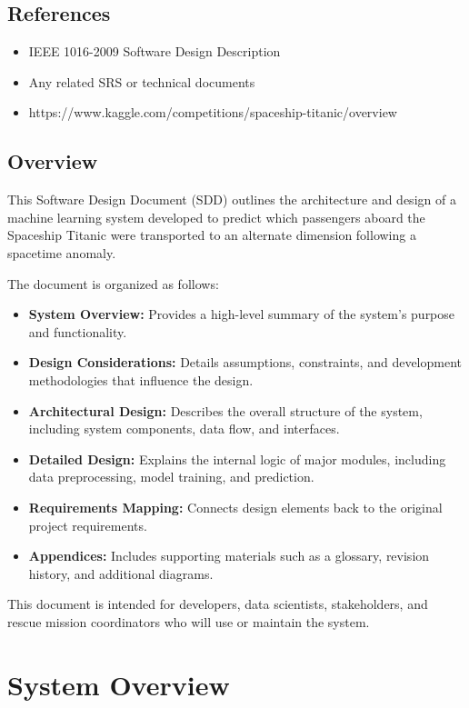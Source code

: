 \documentclass[15pt]{article}
\begin{document}
\subsection{References}
\begin{itemize}
    \item IEEE 1016-2009 Software Design Description
    \item Any related SRS or technical documents
    \item https://www.kaggle.com/competitions/spaceship-titanic/overview
\end{itemize}

\subsection{Overview}
This Software Design Document (SDD) outlines the architecture and design of a machine learning system developed to predict which passengers aboard the Spaceship Titanic were transported to an alternate dimension following a spacetime anomaly.

The document is organized as follows:

\begin{itemize}
    \item \textbf{System Overview:} Provides a high-level summary of the system’s purpose and functionality.
    \item \textbf{Design Considerations:} Details assumptions, constraints, and development methodologies that influence the design.
    \item \textbf{Architectural Design:} Describes the overall structure of the system, including system components, data flow, and interfaces.
    \item \textbf{Detailed Design:} Explains the internal logic of major modules, including data preprocessing, model training, and prediction.
    \item \textbf{Requirements Mapping:} Connects design elements back to the original project requirements.
    \item \textbf{Appendices:} Includes supporting materials such as a glossary, revision history, and additional diagrams.
\end{itemize}


This document is intended for developers, data scientists, stakeholders, and rescue mission coordinators who will use or maintain the system.
\section{System Overview}
\end{document}

